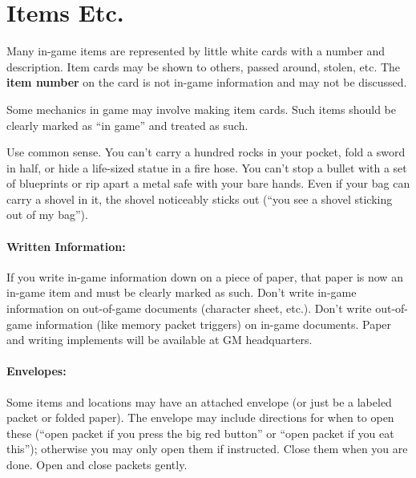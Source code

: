 \documentclass[sheet]{GL2020}
\begin{document}

\section{Items Etc.}

Many in-game items are represented by little white cards with a number and description.  Item cards may be shown to others, passed around, stolen, etc.  The {\bf item number} on the card is not in-game information and may not be discussed.  

Some mechanics in game may involve making item cards. Such items should be clearly marked as ``in game'' and treated as such.

Use common sense. You can't carry a hundred rocks in your pocket, fold a sword in half, or hide a life-sized statue in a fire hose. You can't stop a bullet with a set of blueprints or rip apart a metal safe with your bare hands.  Even if your bag can carry a shovel in it, the shovel noticeably sticks out (``you see a shovel sticking out of my bag'').

\paragraph{Written Information:} If you write in-game information down on a piece of paper, that paper is now an in-game item and must be clearly marked as such. Don't write in-game information on out-of-game documents (character sheet, etc.). Don't write out-of-game information (like memory packet triggers) on in-game documents. Paper and writing implements will be available at GM headquarters.

\paragraph{Envelopes:} Some items and locations may have an attached envelope (or just be a labeled packet or folded paper). The envelope may include directions for when to open these (``open packet if you press the big red button'' or ``open packet if you eat this''); otherwise you may only open them if instructed.  Close them when you are done.  Open and close packets gently.
\end{document}
